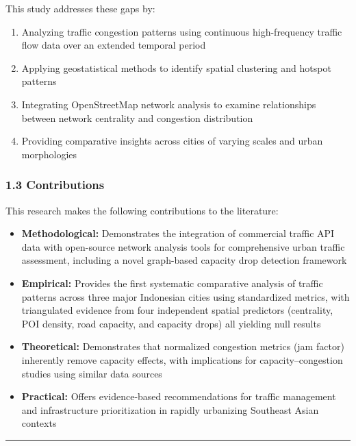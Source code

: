 This study addresses these gaps by:

\begin{enumerate}
\def\labelenumi{\arabic{enumi}.}
\tightlist
\item
  Analyzing traffic congestion patterns using continuous high-frequency traffic flow data over an extended temporal period
\item
  Applying geostatistical methods to identify spatial clustering and hotspot patterns
\item
  Integrating OpenStreetMap network analysis to examine relationships between network centrality and congestion distribution
\item
  Providing comparative insights across cities of varying scales and urban morphologies
\end{enumerate}

\subsubsection{1.3 Contributions}\label{contributions}

This research makes the following contributions to the literature:

\begin{itemize}
\tightlist
\item
  \textbf{Methodological:} Demonstrates the integration of commercial traffic API data with open-source network analysis tools for comprehensive urban traffic assessment, including a novel graph-based capacity drop detection framework
\item
  \textbf{Empirical:} Provides the first systematic comparative analysis of traffic patterns across three major Indonesian cities using standardized metrics, with triangulated evidence from four independent spatial predictors (centrality, POI density, road capacity, and capacity drops) all yielding null results
\item
  \textbf{Theoretical:} Demonstrates that normalized congestion metrics (jam factor) inherently remove capacity effects, with implications for capacity--congestion studies using similar data sources
\item
  \textbf{Practical:} Offers evidence-based recommendations for traffic management and infrastructure prioritization in rapidly urbanizing Southeast Asian contexts
\end{itemize}

\begin{center}\rule{0.5\linewidth}{0.5pt}\end{center}

